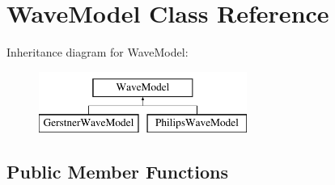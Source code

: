 \hypertarget{classWaveModel}{\section{Wave\-Model Class Reference}
\label{classWaveModel}
}
Inheritance diagram for Wave\-Model\-:\begin{figure}[H]
\begin{center}
\leavevmode
\includegraphics[height=2.000000cm]{classWaveModel}
\end{center}
\end{figure}
\subsection*{Public Member Functions}
